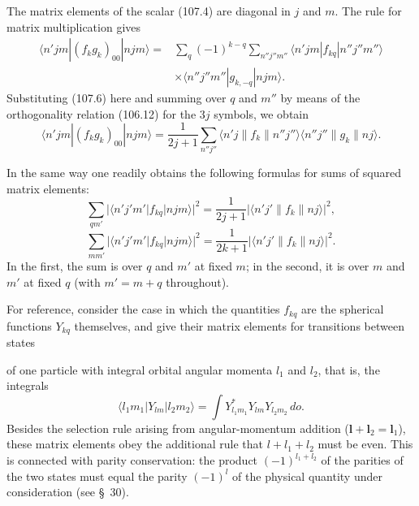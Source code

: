The matrix elements of the scalar (107.4) are diagonal in $j$ and $m$. The rule for matrix multiplication gives
\[
 \begin{aligned}
 \langle n'jm|(f_kg_k)_{00}|njm\rangle
 ={}&\sum_q(-1)^{k-q}\sum_{n''j''m''}
 \langle n'jm|f_{kq}|n''j''m''\rangle\\
 &\times\langle n''j''m''|g_{k,-q}|njm\rangle.
 \end{aligned}
\]
Substituting (107.6) here and summing over $q$ and $m''$ by means of the orthogonality relation (106.12) for the $3j$ symbols, we obtain
\begin{equation}
 \langle n'jm|(f_kg_k)_{00}|njm\rangle=
 \frac1{2j+1}\sum_{n''j''}\langle n'j\|f_k\|n''j''\rangle
 \langle n''j''\|g_k\|nj\rangle.
 \tag{107.10}
\end{equation}

In the same way one readily obtains the following formulas for sums of squared matrix elements:
\begin{equation}
 \sum_{qm'}|\langle n'j'm'|f_{kq}|njm\rangle|^2=
 \frac1{2j+1}|\langle n'j'\|f_k\|nj\rangle|^2,
 \tag{107.11}
\end{equation}
\begin{equation}
 \sum_{mm'}|\langle n'j'm'|f_{kq}|njm\rangle|^2=
 \frac1{2k+1}|\langle n'j'\|f_k\|nj\rangle|^2.
 \tag{107.12}
\end{equation}
In the first, the sum is over $q$ and $m'$ at fixed $m$; in the second, it is over $m$ and $m'$ at fixed $q$ (with $m'=m+q$ throughout).

For reference, consider the case in which the quantities $f_{kq}$ are the spherical functions $Y_{kq}$ themselves, and give their matrix elements for transitions between states

of one particle with integral orbital angular momenta $l_1$ and $l_2$, that is, the integrals
\begin{equation}
 \langle l_1m_1|Y_{lm}|l_2m_2\rangle=\int Y_{l_1m_1}^{*}Y_{lm}Y_{l_2m_2}\,do.
 \tag{107.13}
\end{equation}
Besides the selection rule arising from angular-momentum addition ($\mathbf l+\mathbf l_2=\mathbf l_1$), these matrix elements obey the additional rule that $l+l_1+l_2$ must be even. This is connected with parity conservation: the product $(-1)^{l_1+l_2}$ of the parities of the two states must equal the parity $(-1)^l$ of the physical quantity under consideration (see \S~30).

